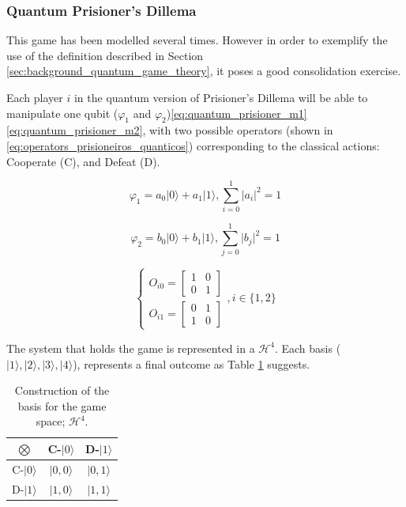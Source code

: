 \subsubsection{Quantum Prisioner's Dillema}
\label{subsubsec:quantum_prisioners_dillema}

This game has been modelled several times. However in order to exemplify the use of the definition described in Section \ref{sec:background_quantum_game_theory}, it poses a good consolidation exercise.

Each player $i$ in the quantum version of Prisioner's Dillema will be able to manipulate one qubit ($\varphi_{1}$ and $\varphi_{2}$)\ref{eq:quantum_prisioner_m1}\ref{eq:quantum_prisioner_m2}, with two possible operators (shown in \ref{eq:operators_prisioneiros_quanticos}) corresponding to the classical actions: Cooperate (C), and Defeat (D). 

\begin{equation}
\label{eq:quantum_prisioner_m1}
\varphi_{1}=a_{0}\vert0\rangle+a_{1}\vert1\rangle,\sum_{i=0}^{1}\vert a_{i}\vert^{2}=1
\end{equation}


\begin{equation}
\label{eq:quantum_prisioner_m2}
\varphi_{2}=b_{0}\vert0\rangle+b_{1}\vert1\rangle,\sum_{j=0}^{1}\vert b_{j}\vert^{2}=1
\end{equation}

\begin{equation}
\label{eq:operators_prisioneiros_quanticos}
\begin{cases}
O_{i0}=\left[\begin{array}{cc}
1 & 0\\
0 & 1
\end{array}\right]\\
O_{i1}=\left[\begin{array}{cc}
0 & 1\\
1 & 0
\end{array}\right]
\end{cases} , i \in \{ 1, 2 \}
\end{equation}


The system that holds the game is represented in a $\mathcal{H}^{4}$. Each basis ($\vert 1\rangle, \vert 2\rangle, \vert 3\rangle, \vert 4\rangle$), represents a final outcome as Table \ref{tab:prisioners_m} suggests.

\begin{table}
\begin{centering}
\begin{tabular}{ccc}
\hline 
$\bigotimes$ & C-$\vert 0\rangle$ & D-$\vert 1\rangle$\tabularnewline
\hline 
C-$\vert 0\rangle$ & $\vert 0,0\rangle$ & $\vert 0,1\rangle$\tabularnewline
D-$\vert 1\rangle$ & $\vert 1,0\rangle$ & $\vert 1,1\rangle$\tabularnewline
\hline 
\end{tabular}
\par\end{centering}

\caption{Construction of the basis for the game space; $\mathcal{H}^{4}$.}
\label{tab:prisioners_m}
\end{table}

